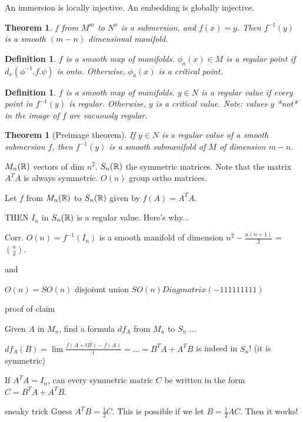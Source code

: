 \documentclass[11pt,leqno,oneside]{amsart}
\newcommand{\de}{\emph}
\theoremstyle{mystyle} \newtheorem{thrm}[thm]{Theorem}
\theoremstyle{mystyle} \newtheorem{defi}[thm]{Definition}
\begin{document}
An immersion is locally injective.  An embedding is globally injective.

\begin{thrm}
	$f$ from $M^m$ to $N^n$ is a submersion, and $f(x) = y$.  Then $f^{-1}(y)$ is a smooth $(m-n)$ dimensional manifold.
\end{thrm}

\begin{defi}
	$f$ is a smooth map of manifolds.
	$\phi_a(x) \in M$ is a \de{regular} point if $d_x(\phi^{-1}.f.\psi)$ is onto.  Otherwise, $\phi_a(x)$ is a \de{critical} point.
\end{defi}

\begin{defi}
	$f$ is a smooth map of manifolds.
	$y \in N$ is a \de{regular} value if every point in $f^{-1}(y)$ is regular.  Otherwise, $y$ is a \de{critical} value.  Note: values $y$ *not* in the image of $f$ are vacuously regular.
\end{defi}

\begin{thrm}[Preimage theorem]
	If $y \in N$ is a regular value of a smooth submersion $f$, then $f^{-1}(y)$ is a smooth submanifold of $M$ of dimension $m-n$.
\end{thrm}

\begin{example}
	$M_n({\mathbb R})$ vectors of dim $n^2$.  $S_n({\mathbb R})$ the symmetric matrices.  Note that the matrix $A^T A$ is always symmetric.  $O(n)$ group ortho matrices.

	Let $f$ from $M_n({\mathbb R})$ to $S_n({\mathbb R})$ given by $f(A) = A^T A$.

	THEN $I_n$ in $S_n({\mathbb R})$ is a regular value.  Here's why...

	Corr. $O(n) = f^{-1}(I_n)$ is a smooth manifold of dimension $n^2 - \frac{n(n+1)}{2}$ = $\binom n2$.

	and

	$O(n) = SO(n)$ disjoiunt union $SO(n)Diagmatrix(-1 1 1 1 1 1 1 1 1)$

	proof of claim

	Given $A$ in $M_n$, find a formula $df_A$ from $M_n$ to $S_n$ ...

	$df_A(B) = \lim \frac{f(A+tB) - f(A)}{t} = \ldots = B^T A + A^T B$
	is indeed in $S_n$! (it is symmetric)

	If $A^T A = I_n$, can every symmetric matric $C$ be written in the form $C = B^T A + A^T B$.

	sneaky trick
	Guess $A^T B = \frac12 C$.
	This is possible if we let $B = \frac12 AC$.
	Then it works!
\end{example}
\end{document}
